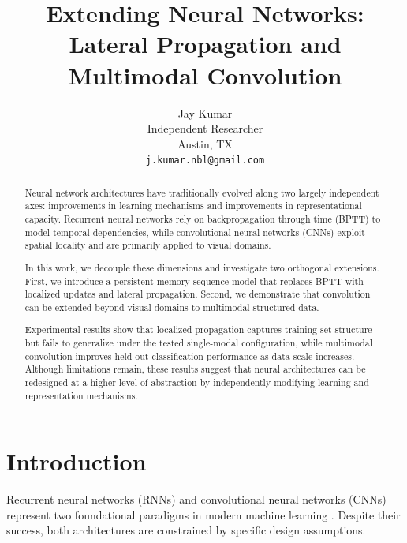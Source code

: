 \documentclass[lineno]{wlpeerj}
\begin{document}
	\title{Extending Neural Networks: Lateral Propagation and Multimodal Convolution}
	
	\author{
		Jay Kumar \\
		Independent Researcher \\
		Austin, TX \\
		\texttt{j.kumar.nbl@gmail.com}
	}
	
	
	\begin{abstract}
		
		Neural network architectures have traditionally evolved along two largely independent axes: improvements in learning mechanisms and improvements in representational capacity. Recurrent neural networks rely on backpropagation through time (BPTT) to model temporal dependencies, while convolutional neural networks (CNNs) exploit spatial locality and are primarily applied to visual domains.
		
		In this work, we decouple these dimensions and investigate two orthogonal extensions. First, we introduce a persistent-memory sequence model that replaces BPTT with localized updates and lateral propagation. Second, we demonstrate that convolution can be extended beyond visual domains to multimodal structured data.
		
	Experimental results show that localized propagation captures training-set structure but fails to generalize under the tested single-modal configuration, while multimodal convolution improves held-out classification performance as data scale increases. Although limitations remain, these results suggest that neural architectures can be redesigned at a higher level of abstraction by independently modifying learning and representation mechanisms.
	\end{abstract}
	
	
	\flushbottom
	
	\maketitle
	
	\thispagestyle{empty}
	\section{Introduction}
	Recurrent neural networks (RNNs) and convolutional neural networks (CNNs) represent two foundational paradigms in modern machine learning \cite{goodfellow2016deep, lecun1998gradient}. Despite their success, both architectures are constrained by specific design assumptions.
	
\end{document}
